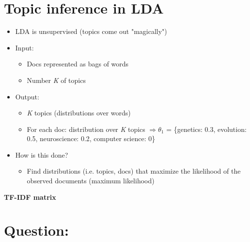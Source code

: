 \documentclass[11pt]{article}
\begin{document}
\section*{Topic inference in LDA}
\begin{itemize}
	\item LDA is unsupervised (topics come out "magically")
	\item Input:
		\begin{itemize}
			\item Docs represented as bags of words
			\item Number \textit{K} of topics
		\end{itemize}
	\item Output:
		\begin{itemize}
			\item \textit{K} topics (distributions over words)
			\item For each doc: distribution over \textit{K} topics $\Rightarrow \theta_1$ = \{genetics: 0.3, evolution: 0.5, neuroscience: 0.2, computer science: 0\}
		\end{itemize}
	\item How is this done?
		\begin{itemize}
			\item Find distributions (i.e. topics, docs) that maximize the likelihood of the observed documents (maximum likelihood)
		\end{itemize}
\end{itemize}

\vspace{0.5cm}

\begin{center}
  {\LARGE \textbf{TF-IDF matrix}}
\end{center}
\vspace{0.5cm}

\section*{Question:}
\end{document}
